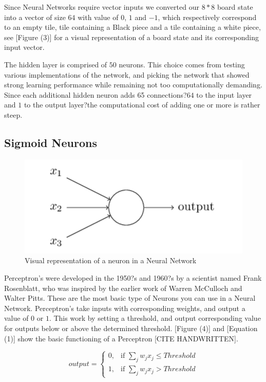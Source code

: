 \documentclass{sig-alternate-05-2015}
\begin{document}
Since Neural Networks require vector inputs we converted our $8*8$ board state into a vector of size $64$ with value of $0$, $1$ and $-1$, which respectively correspond to an empty tile, tile containing a Black piece and a tile containing a white piece, see [Figure (3)] for a visual representation of a board state and its corresponding input vector.

The hidden layer is comprised of $50$ neurons. This choice comes from testing various implementations of the network, and picking the network that showed strong learning performance while remaining not too computationally demanding. Since each additional hidden neuron adds 65 connections?$64$ to the input layer and $1$ to the output layer?the computational cost of adding one or more is rather steep.
 
\subsection{Sigmoid Neurons}
\begin{figure}[h!]
  \includegraphics[width=\linewidth]{neuron.png}
  \caption{Visual representation of a neuron in a Neural Network}
  \label{fig:neuron4}
\end{figure}
 
        	Perceptron's were developed in the 1950?s and 1960?s by a scientist named Frank Rosenblatt, who was inspired by the earlier work of Warren McCulloch and Walter Pitts. These are the most basic type of Neurons you can use in a Neural Network. Perceptron's take inputs with corresponding weights, and output a value of $0$ or $1$. This work by setting a threshold, and output corresponding value for outputs below or above the determined threshold. [Figure (4)] and [Equation (1)] show the basic functioning of a Perceptron [CITE HANDWRITTEN].

\begin{equation}
output =
\left\{
	\begin{array}{ll}
		0, & \mbox{if } \sum_j  w_j x_j \leq Threshold \\
		1, & \mbox{if } \sum_j  w_j x_j > Threshold
	\end{array}
\right.
\end{equation}
\end{document}
